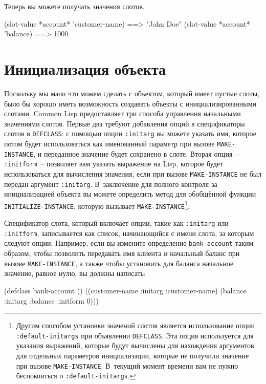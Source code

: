 Теперь вы можете получать значения слотов.

\begin{myverb}
(slot-value *account* 'customer-name) ==> "John Doe"
(slot-value *account* 'balance)       ==> 1000
\end{myverb}

\section{Инициализация объекта}

Поскольку мы мало что можем сделать с объектом, который имеет пустые слоты, было бы хорошо
иметь возможность создавать объекты с инициализированными слотами.  Common Lisp
предоставляет три способа управления начальными значениями слотов.  Первые два требуют
добавления опций в спецификаторы слотов в \lstinline{DEFCLASS}: с помощью опции
\lstinline{:initarg} вы можете указать имя, которое потом будет использоваться как
именованный параметр при вызове \lstinline{MAKE-INSTANCE}, и переданное значение будет
сохранено в слоте.  Вторая опция~-- \lstinline{:initform}~-- позволяет вам указать выражение
на Lisp, которое будет использоваться для вычисления значения, если при вызове
\lstinline{MAKE-INSTANCE} не был передан аргумент \lstinline{:initarg}.  В~заключение
для полного контроля за инициализацией объекта вы можете определить метод для обобщённой
функции \lstinline{INITIALIZE-INSTANCE}, которую вызывает
\lstinline{MAKE-INSTANCE}\footnote{Другим способом установки значений слотов является
  использование опции \lstinline{:default-initargs} при объявлении \lstinline{DEFCLASS}.
  Эта опция используется для указания выражений, которые будут вычислены для нахождения
  аргументов для отдельных параметров инициализации, которые не получили значение при
  вызове \lstinline{MAKE-INSTANCE}.  В~текущий момент времени вам не нужно беспокоиться о
  \lstinline{:default-initargs}.}\hspace{\footnotenegspace}.

Спецификатор слота, который включает опции, такие как \lstinline{:initarg} или
\lstinline{:initform}, записывается как список, начинающийся с имени слота, за которым следуют
опции.  Например, если вы измените определение \lstinline{bank-account} таким образом, чтобы
позволить передавать имя клиента и начальный баланс при вызове \lstinline{MAKE-INSTANCE}, а
также чтобы установить для баланса начальное значение, равное нулю, вы должны написать:

\begin{myverb}
(defclass bank-account ()
  ((customer-name
    :initarg :customer-name)
   (balance
    :initarg :balance
    :initform 0)))
\end{myverb}

